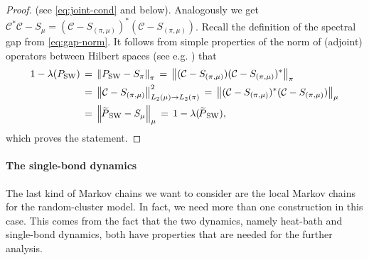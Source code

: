 \documentclass{dis}
\theoremstyle{citing}
\begin{document}
\begin{proof}
(see \eqref{eq:joint-cond} and below). 
Analogously we get 
${\mathcal{C}}^* {\mathcal{C}}-S_{\mu}=({\mathcal{C}}-S_{(\pi,\mu)})^*({\mathcal{C}}-S_{(\pi,\mu)})$.
Recall the definition of the spectral gap from \eqref{eq:gap-norm}. 
It follows from simple properties of the norm of (adjoint) operators 
between Hilbert spaces (see e.g. \cite[Thm.~3.9-4]{Krey}) that
\[\begin{split}
1-\lambda({P_{\rm SW}}) \,&=\, {\left\Vert {{P_{\rm SW}}-S_\pi} \right\Vert}_\pi
\,=\, {\left\Vert {({\mathcal{C}}-S_{(\pi,\mu)})({\mathcal{C}}-S_{(\pi,\mu)})^*} \right\Vert}_\pi \\
&=\, {\left\Vert {{\mathcal{C}}-S_{(\pi,\mu)}} \right\Vert}_{L_2(\mu)\to L_2(\pi)}^2 
\,=\, {\left\Vert {({\mathcal{C}}-S_{(\pi,\mu)})^*({\mathcal{C}}-S_{(\pi,\mu)})} \right\Vert}_\mu \\
&=\, {\left\Vert {{{\raisebox{2pt}{ ${\widetilde{{}}}$ }\mkern-14mu P}_{\rm SW}}-S_\mu} \right\Vert}_\mu \,=\, 1-\lambda({{\raisebox{2pt}{ ${\widetilde{{}}}$ }\mkern-14mu P}_{\rm SW}}),
\end{split}\]
which proves the statement.
\end{proof}

\vspace{1mm}

\paragraph{\bf The single-bond dynamics}

The last kind of Markov chains we want to consider are the 
local Markov chains for the random-cluster model.
In fact, we need more than one construction in this case.
This comes from the fact that the two dynamics, 
namely heat-bath and single-bond dynamics, both have 
properties that are needed for the further analysis.
\end{document}
